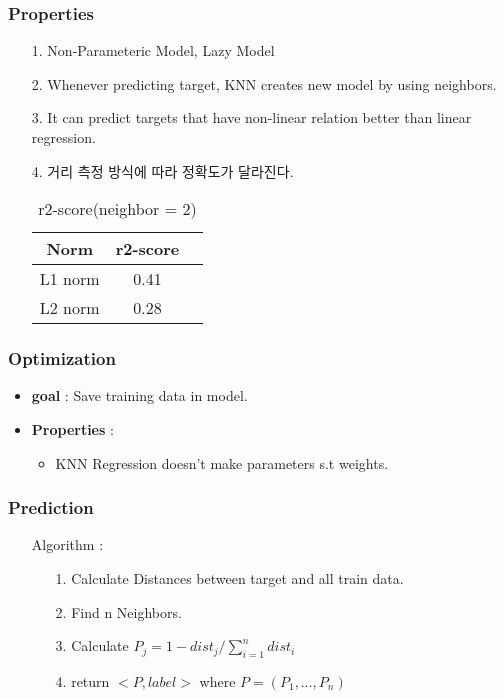 \documentclass{article}
\begin{document}
\subsubsection{Properties}
\begin{itemize}
    \item [1.] Non-Parameteric Model, Lazy Model
    \item [2.] Whenever predicting target, KNN creates new model by using neighbors.
    \item [3.] It can predict targets that have non-linear relation better than linear regression. 
    \item[4.] 거리 측정 방식에 따라 정확도가 달라진다.
            \begin{table}[h]
                \centering
                \begin{tabular}{c|c|c}
                Norm    & r2-score \\ \hline
                L1 norm & 0.41  \\ \hline 
                L2 norm & 0.28\\
                \end{tabular}
                \caption{r2-score(neighbor = 2)}
                \label{tab:my_label}
            \end{table}    
\end{itemize}


\subsubsection{Optimization}
\begin{itemize}
    \item \textbf{goal} : Save training data in model.
    \item \textbf{Properties} : 
    \begin{itemize}
        \item KNN Regression doesn't make parameters s.t weights.
    \end{itemize}
\end{itemize}

\subsubsection{Prediction}
\begin{itemize}
    \item[Algorithm] : 
        \begin{itemize}
            \item[1.] Calculate Distances between target and all train data.
            \item[2.] Find n Neighbors.
            \item[3.] Calculate $P_j = 1 - dist_j/\sum_{i=1}^{n}{dist_i}$
            \item[4.] return $<P,label>$ where $P = (P_1,\dots,P_n)$
        \end{itemize}
\end{itemize}
\end{document}

